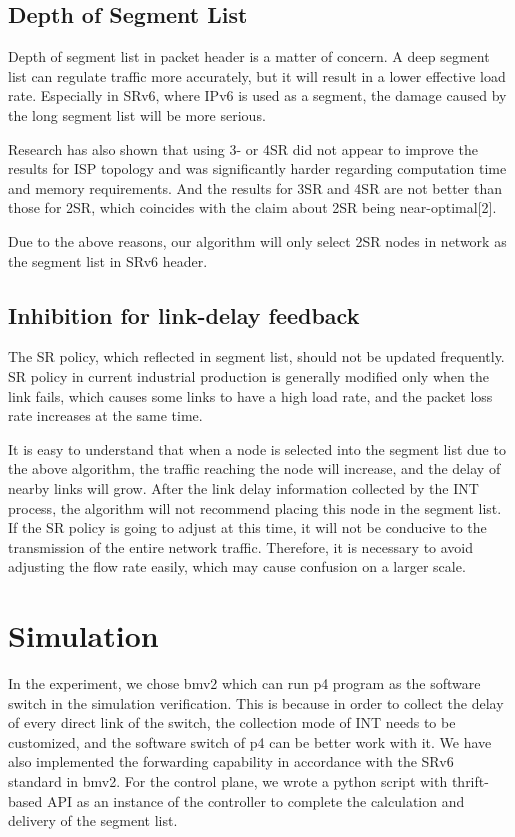 \documentclass[conference]{IEEEtran}
\begin{document}
\subsection{Depth of Segment List}
Depth of segment list in packet header is a matter of concern. A deep segment list can regulate traffic more accurately, but it will result in a lower effective load rate. Especially in SRv6, where IPv6 is used as a segment, the damage caused by the long segment list will be more serious. 

Research has also shown that using 3- or 4SR did not appear to improve the results for ISP topology and was significantly harder regarding computation time and memory requirements. And the results for 3SR and 4SR are not better than those for 2SR, which coincides with the claim about 2SR being near-optimal[2].

Due to the above reasons, our algorithm will only select 2SR nodes in network as the segment list in SRv6 header.

\subsection{Inhibition for link-delay feedback}
The SR policy, which reflected in segment list, should not be updated frequently. SR policy in current industrial production is generally modified only when the link fails, which causes some links to have a high load rate, and the packet loss rate increases at the same time. 

It is easy to understand that when a node is selected into the segment list due to the above algorithm, the traffic reaching the node will increase, and the delay of nearby links will grow. After the link delay information collected by the INT process, the algorithm will not recommend placing this node in the segment list. If the SR policy is going to adjust at this time, it will not be conducive to the transmission of the entire network traffic. Therefore, it is necessary to avoid adjusting the flow rate easily, which may cause confusion on a larger scale.

\section{Simulation}
In the experiment, we chose bmv2 which can run p4 program as the software switch in the simulation verification. This is because in order to collect the delay of every direct link of the switch, the collection mode of INT needs to be customized, and the software switch of p4 can be better work with it. We have also implemented the forwarding capability in accordance with the SRv6 standard in bmv2. For the control plane, we wrote a python script with thrift-based API as an instance of the controller to complete the calculation and delivery of the segment list.
\end{document}
